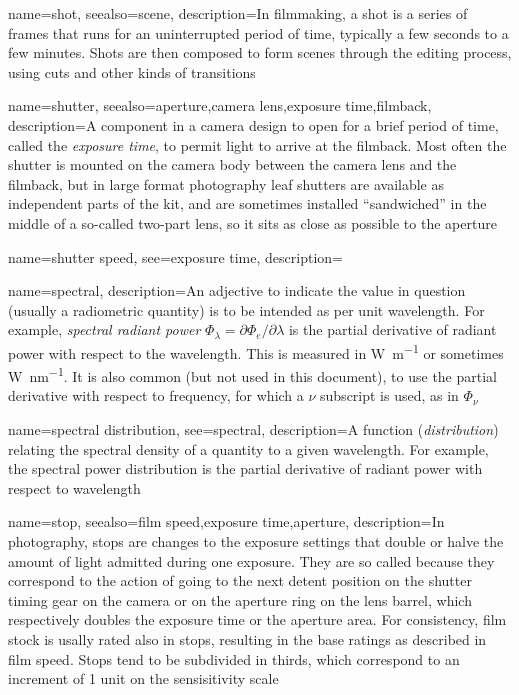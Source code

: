 {
	name={shot},
	seealso={scene},
	description={In filmmaking, a shot is a series of frames that runs for an uninterrupted
		period of time, typically a few seconds to a few minutes. Shots are then composed
		to form scenes through the editing process, using cuts and other kinds of transitions}
}

{
	name={shutter},
	seealso={aperture,camera lens,exposure time,filmback},
	description={A component in a camera design to open for a brief period of time, called the 
		\textsl{exposure time}, to permit light to arrive at the filmback. 
		Most often the shutter is mounted on the camera body between the camera lens 
		and the filmback, but in large format photography leaf shutters are available as 
		independent parts of the kit, and are sometimes installed ``sandwiched'' in the
		middle of a so-called two-part lens, so it sits as close as possible to the
		aperture}
}

{    
	name={shutter speed},
	see={exposure time},
	description=\nopostdesc
}

{    
	name={spectral},
	description={An adjective to indicate the value in question (usually a radiometric quantity)
		is to be intended as per unit wavelength. For example, \textsl{spectral radiant power}
		$\Phi_\lambda = \partial\Phi_e / \partial\lambda$ is the partial derivative of 
		radiant power with respect to the wavelength. This is measured in 
		\unit{\watt\per\meter} or sometimes \unit{\watt\per\nano\meter}.
		It is also common (but not used in this document), to use the partial derivative
		with respect to frequency, for which a $\nu$ subscript is used, as in $\Phi_\nu$}
}

{
	name={spectral distribution},
	see={spectral},
	description={A function (\textsl{distribution}) relating the spectral density of a 
		quantity to a given wavelength. For example, the spectral power distribution  is the partial derivative of radiant power with respect to
		wavelength}
}

{
	name={stop},
	seealso={film speed,exposure time,aperture},
	description={In photography, stops are changes to the exposure settings that
		double or halve the amount of light admitted during one exposure. 
		They are so called because they correspond to the action of going to the 
		next detent position on the shutter timing gear on the camera or on the 
		aperture ring on the lens barrel, which respectively doubles the 
		exposure time or the aperture area.
		For consistency, film stock is usally rated also in stops, 
		resulting in the base ratings as described in \gls{film speed}. 
		Stops tend to be subdivided in thirds, which correspond
		to an increment of 1 unit on the  sensisitivity scale}
}

